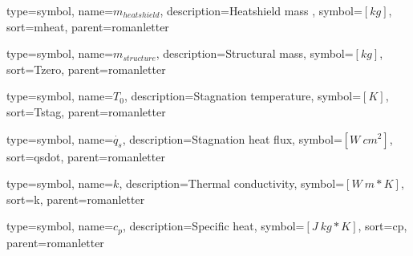 {
type=symbol, %
name={\ensuremath{m_{heatshield}}}, %
description={Heatshield mass }, %
symbol={$\left[kg \right]$}, %
sort=mheat, %
parent=romanletter %
}

{
type=symbol, %
name={\ensuremath{m_{structure}}}, %
description={Structural mass}, %
symbol={$\left[kg \right]$}, %
sort=Tzero, %
parent=romanletter %
}

{
type=symbol, %
name={\ensuremath{T_0}}, %
description={Stagnation temperature}, %
symbol={$\left[K \right]$}, %
sort=Tstag, %
parent=romanletter %
}

{
type=symbol, %
name={\ensuremath{\dot{q_s}}}, %
description={Stagnation heat flux}, %
symbol={$\left[W \ {cm}^2 \right]$}, %
sort=qsdot, %
parent=romanletter %
}

{
type=symbol, %
name={\ensuremath{k}}, %
description={Thermal conductivity}, %
symbol={$\left[W \ {m*K} \right]$}, %
sort=k, %
parent=romanletter %
}

{
type=symbol, %
name={\ensuremath{c_p}}, %
description={Specific heat}, %
symbol={$\left[J \ {kg*K} \right]$}, %
sort=cp, %
parent=romanletter %
}












